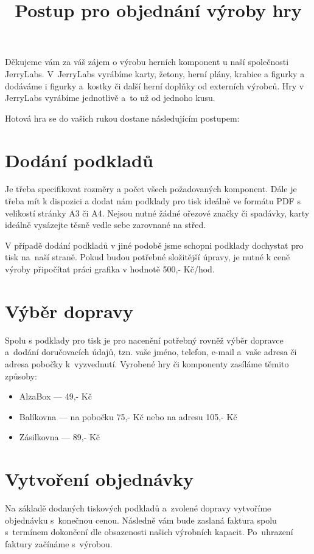 \documentclass[14pt,a4paper]{extarticle}
\title{Postup pro objednání výroby hry}
\author{}
\date{}
\makeatletter
\renewcommand{\maketitle}{
  \begin{flushleft}
     {\LARGE\bfseries \@title \par}
    \vspace{1em}
  \end{flushleft}
}
\makeatother
\begin{document}
	

\maketitle

Děkujeme vám za váš zájem o výrobu herních komponent u naší společnosti JerryLabs. V~JerryLabs vyrábíme karty, žetony, herní plány, krabice a figurky a dodáváme i figurky a~kostky či další herní doplňky od externích výrobců. Hry v JerryLabs vyrábíme jednotlivě a~to už od jednoho kusu. 

Hotová hra se do vašich rukou dostane následujícím postupem:

\section{Dodání podkladů}
Je třeba specifikovat rozměry a počet všech požadovaných komponent. Dále je třeba mít k dispozici a dodat nám podklady pro tisk ideálně ve formátu PDF s velikostí stránky A3 či A4. Nejsou nutné žádné ořezové značky či spadávky, karty ideálně vysázejte těsně vedle sebe zarovnané na střed.

V případě dodání podkladů v jiné podobě jsme schopni podklady dochystat pro tisk na~naší straně. Pokud budou potřebné složitější úpravy, je nutné k ceně výroby připočítat práci grafika v hodnotě 500,- Kč/hod.

\section{Výběr dopravy}

Spolu s podklady pro tisk je pro nacenění potřebný rovněž výběr dopravce a~dodání doručovacích údajů, tzn. vaše jméno, telefon, e-mail a~vaše adresa či adresa pobočky k~vyzvednutí. Vyrobené hry či komponenty zasíláme těmito způsoby:
\begin{itemize}
	\item AlzaBox --- 49,- Kč
	\item Balíkovna --- na pobočku 75,- Kč nebo na adresu 105,- Kč
	\item Zásilkovna --- 89,- Kč
\end{itemize}

\section{Vytvoření objednávky}
Na základě dodaných tiskových podkladů a~zvolené dopravy vytvoříme objednávku s~konečnou cenou. Následně vám bude zaslaná faktura spolu s~termínem dokončení dle obsazenosti našich výrobních kapacit. Po~uhrazení faktury začínáme s~výrobou.
\end{document}
